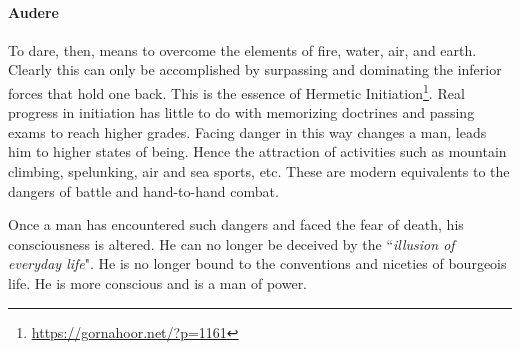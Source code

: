 \paragraph{Audere}
To dare, then, means to overcome the elements of fire, water, air, and earth. Clearly this can only be accomplished by surpassing and dominating the inferior forces that hold one back. This is the essence of Hermetic Initiation\footnote{\url{https://gornahoor.net/?p=1161}}. Real progress in initiation has little to do with memorizing doctrines and passing exams to reach higher grades. Facing danger in this way changes a man, leads him to higher states of being. Hence the attraction of activities such as mountain climbing, spelunking, air and sea sports, etc. These are modern equivalents to the dangers of battle and hand-to-hand combat.

Once a man has encountered such dangers and faced the fear of death, his consciousness is altered. He can no longer be deceived by the ``\emph{illusion of everyday life}". He is no longer bound to the conventions and niceties of bourgeois life. He is more conscious and is a man of power.



